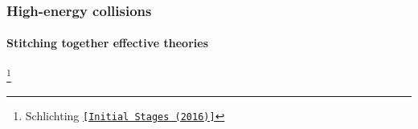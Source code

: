 \documentclass[aspectratio=169,11pt,usenames,dvipsnames]{beamer}
\renewcommand{\thefootnote}{$\star$}
\newcommand\blfootnote[1]{%
  \begingroup
  \renewcommand\thefootnote{}\footnote{#1}%
  \addtocounter{footnote}{-1}%
  \endgroup
}
\begin{document}
\begin{frame}
    \frametitle{High-energy collisions}
    \framesubtitle{Stitching together effective theories}

    \begin{center}
    \end{center}
        
    \blfootnote{\scriptsize Schlichting \href{https://indico.cern.ch/event/469857/contributions/1978347/attachments/1277798/1896654/SchlichtingIS2016.pdf}{{\color{customblue}\texttt{[Initial Stages (2016)]}}}}
\end{frame}


\end{document}

